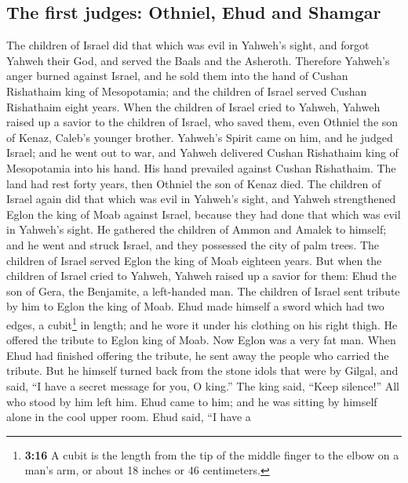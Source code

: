 \begin{paracol}{2}
\begin{otherlanguage}{english}
{\subsection{The first judges: Othniel, Ehud and
Shamgar}\label{the-first-judges-othniel-ehud-and-shamgar}}

 The children of Israel did that which was evil in
Yahweh's sight, and forgot Yahweh their God, and served the Baals and
the Asheroth.  Therefore Yahweh's anger burned against
Israel, and he sold them into the hand of Cushan Rishathaim king of
Mesopotamia; and the children of Israel served Cushan Rishathaim eight
years.  When the children of Israel cried to Yahweh,
Yahweh raised up a savior to the children of Israel, who saved them,
even Othniel the son of Kenaz, Caleb's younger brother. 
Yahweh's Spirit came on him, and he judged Israel; and he went out to
war, and Yahweh delivered Cushan Rishathaim king of Mesopotamia into his
hand. His hand prevailed against Cushan Rishathaim.  The
land had rest forty years, then Othniel the son of Kenaz died.
 The children of Israel again did that which was evil in
Yahweh's sight, and Yahweh strengthened Eglon the king of Moab against
Israel, because they had done that which was evil in Yahweh's sight.
 He gathered the children of Ammon and Amalek to himself;
and he went and struck Israel, and they possessed the city of palm
trees.  The children of Israel served Eglon the king of
Moab eighteen years.  But when the children of Israel
cried to Yahweh, Yahweh raised up a savior for them: Ehud the son of
Gera, the Benjamite, a left-handed man. The children of Israel sent
tribute by him to Eglon the king of Moab.  Ehud made
himself a sword which had two edges, a cubit\footnote{\textbf{3:16} A
  cubit is the length from the tip of the middle finger to the elbow on
  a man's arm, or about 18 inches or 46 centimeters.} in length; and he
wore it under his clothing on his right thigh.  He
offered the tribute to Eglon king of Moab. Now Eglon was a very fat man.
 When Ehud had finished offering the tribute, he sent
away the people who carried the tribute.  But he himself
turned back from the stone idols that were by Gilgal, and said, ``I have
a secret message for you, O king.'' The king said, ``Keep silence!'' All
who stood by him left him.  Ehud came to him; and he was
sitting by himself alone in the cool upper room. Ehud said, ``I have a

\end{otherlanguage}
\end{paracol}
